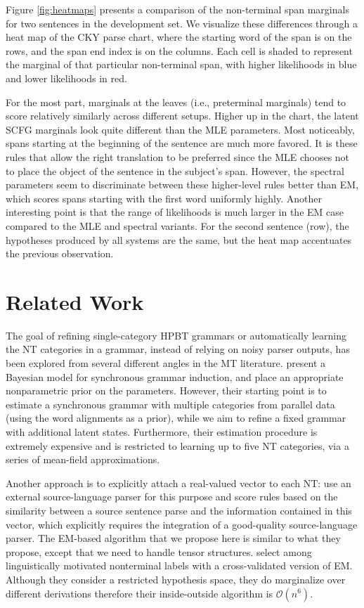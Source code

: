 \documentclass[11pt]{article}
\begin{document}
Figure \ref{fig:heatmaps} presents a comparison of the non-terminal span marginals for two sentences in the development set.  
We visualize these differences through a heat map of the CKY parse chart, where the starting word of the span is on the rows, and the span end index is on the columns.  
Each cell is shaded to represent the marginal of that particular non-terminal span, with higher likelihoods in blue and lower likelihoods in red. 

For the most part, marginals at the leaves (i.e., preterminal marginals) tend to score relatively similarly across different setups. 
Higher up in the chart, the latent SCFG marginals look quite different than the MLE parameters.  
Most noticeably, spans starting at the beginning of the sentence are much more favored. 
It is these rules that allow the right translation to be preferred since the MLE chooses not to place the object of the sentence in the subject's span.  
However, the spectral parameters seem to discriminate between these higher-level rules better than EM, which scores spans starting with the first word uniformly highly.  
Another interesting point is that the range of likelihoods is much larger in the EM case compared to the MLE and spectral variants. 
For the second sentence (row), the hypotheses produced by all systems are the same, but the heat map accentuates the previous observation. 

\section{Related Work}
\label{sec:related}
The goal of refining single-category HPBT grammars or automatically learning the NT categories in a grammar, instead of relying on noisy parser outputs, has been explored from several different angles in the MT literature. 
 present a Bayesian model for synchronous grammar induction, and place an appropriate nonparametric prior on the parameters. 
However, their starting point is to estimate a synchronous grammar with multiple categories from parallel data (using the word alignments as a prior), while we aim to refine a fixed grammar with additional latent states.  
Furthermore, their estimation procedure is extremely expensive and is restricted to learning up to five NT categories, via a series of mean-field approximations. 

Another approach is to explicitly attach a real-valued vector to each NT:  use an external source-language parser for this purpose and score rules based on the similarity between a source sentence parse and the information contained in this vector, which explicitly requires the integration of a good-quality source-language parser. 
The EM-based algorithm that we propose here is similar to what they propose, except that we need to handle tensor structures.  
 select among linguistically motivated nonterminal labels with a cross-validated version of EM. Although they consider a restricted hypothesis space, they do marginalize over different derivations therefore their inside-outside algorithm is $\mathcal{O}(n^6)$.  
\end{document}
